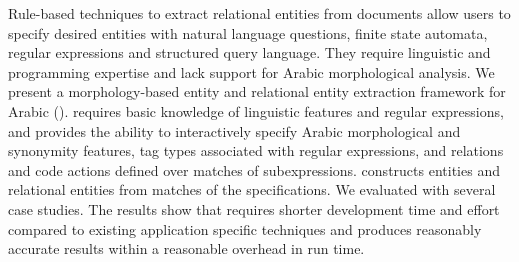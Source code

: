 Rule-based techniques to extract relational entities from 
documents allow users to specify desired entities with 
natural language questions, finite state automata, regular expressions and
structured query language. 
They require linguistic and programming expertise and 
lack support for Arabic morphological analysis.
We present a morphology-based entity and relational entity extraction 
framework for Arabic (\framework).
\framework requires
basic knowledge of linguistic features and regular expressions, 
and provides the ability to interactively specify
Arabic morphological and synonymity features, 
tag types associated with regular expressions, and
relations and code actions defined over matches of subexpressions. 
\framework constructs entities and relational entities from matches 
of the specifications.
We evaluated \framework with several case studies.
The results show that \framework requires shorter development time and effort compared to existing application specific techniques and produces 
reasonably accurate results within a reasonable overhead in run time.
